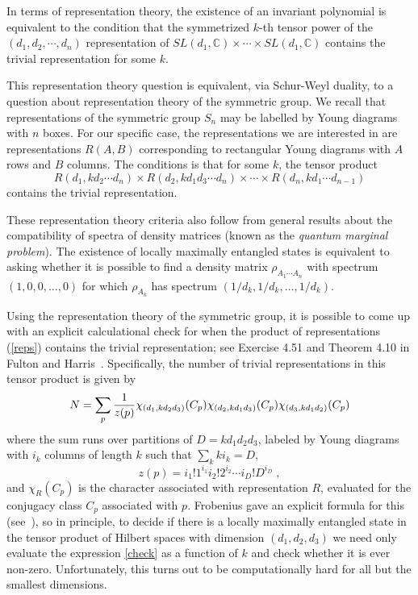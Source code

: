 \documentclass[12pt]{article}
\theoremstyle{definition}
\newcommand{\be}{\begin{equation}}
\newcommand{\ee}{\end{equation}}
\begin{document}
In terms of representation theory, the existence of an invariant polynomial is equivalent to the condition that the symmetrized $k$-th tensor power of the $(d_1,d_2,\cdots, d_n)$ representation of $SL(d_1, \mathbb{C}) \times \cdots \times SL(d_1, \mathbb{C})$ contains the trivial representation for some $k$.

This representation theory question is equivalent, via Schur-Weyl duality, to a question about representation theory of the symmetric group. We recall that representations of the symmetric group $S_n$ may be labelled by Young diagrams with $n$ boxes. For our specific case, the representations we are interested in are representations $R(A,B)$ corresponding to rectangular Young diagrams with $A$ rows and $B$ columns. The conditions is that for some $k$, the tensor product
\be
\label{reps}
R(d_1, k d_2 \cdots d_n) \times R(d_2, k d_1 d_3 \cdots d_n) \times \cdots \times R(d_n, k d_1 \cdots d_{n-1})
\ee
contains the trivial representation.

These representation theory criteria also follow from general results about the compatibility of spectra of density matrices (known as the {\it quantum marginal problem}). The existence of locally maximally entangled states is equivalent to asking whether it is possible to find a density matrix $\rho_{A_1 \cdots A_n}$ with spectrum $(1,0,0,\dots,0)$ for which $\rho_{A_k}$ has spectrum $(1/d_k,1/d_k, \dots, 1/d_k)$.

Using the representation theory of the symmetric group, it is possible to come up with an explicit calculational check for when the product of representations (\ref{reps}) contains the trivial representation; see Exercise 4.51 and Theorem 4.10 in Fulton and Harris~\cite{fh}. Specifically, the number of trivial representations in this tensor product is given by
\be
\label{check}
N = \sum_p {1 \over z(p)} \chi_{(d_1, k d_2 d_3)}(C_p) \chi_{(d_2, k d_1 d_3)}(C_p) \chi_{(d_3, k d_1 d_2)}(C_p)
\ee
where the sum runs over partitions of $D = k d_1 d_2 d_3$, labeled by Young diagrams with $i_k$ columns of length $k$  such that $\sum_k k i_k = D$,
\be
z(p) = i_1!1^{i_1} i_2! 2^{i_2} \cdots i_D! D^{i_D} \; ,
\ee
and $\chi_R(C_p)$ is the character associated with representation $R$, evaluated for the conjugacy class $C_p$ associated with $p$. Frobenius gave an explicit formula for this (see~\cite[4.10]{fh}), so in principle, to decide if there is a locally maximally entangled state in the tensor product of Hilbert spaces with dimension $(d_1,d_2,d_3)$ we need only evaluate the expression \eqref{check} as a function of $k$ and check whether it is ever non-zero. Unfortunately, this turns out to be computationally hard for all but the smallest dimensions.
\end{document}
